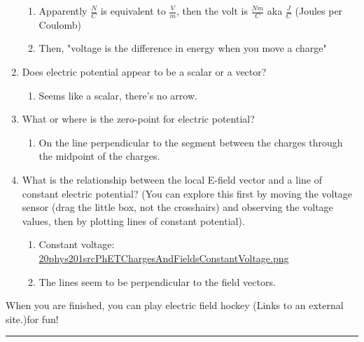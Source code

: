 \documentclass[letterpaper]{article}
\begin{document}
\begin{enumerate}
\begin{enumerate}
\item Apparently \(\frac{N}{C}\) is equivalent to \(\frac{V}{m}\), then
the volt is \(\frac{Nm}{C}\) aka \(\frac{J}{C}\) (Joules per
Coulomb)
\item Then, "voltage is the difference in energy when you move a charge"
\end{enumerate}

\item Does electric potential appear to be a scalar or a vector?

\begin{enumerate}
\item Seems like a scalar, there's no arrow.
\end{enumerate}

\item What or where is the zero-point for electric potential?

\begin{enumerate}
\item On the line perpendicular to the segment between the charges
through the midpoint of the charges.
\end{enumerate}

\item What is the relationship between the local E-field vector and a line
of constant electric potential? (You can explore this first by moving
the voltage sensor (drag the little box, not the crosshairs) and
observing the voltage values, then by plotting lines of constant
potential).

\begin{enumerate}
\item Constant voltage:
\href{20phys201srcPhETChargesAndFieldsConstantVoltage.png.org}{20phys201srcPhETChargesAndFieldsConstantVoltage.png}
\item The lines seem to be perpendicular to the field vectors.
\end{enumerate}
\end{enumerate}

When you are finished, you can play electric field hockey (Links to an
external site.)for fun!

\noindent\rule{\textwidth}{0.5pt}
\end{document}
